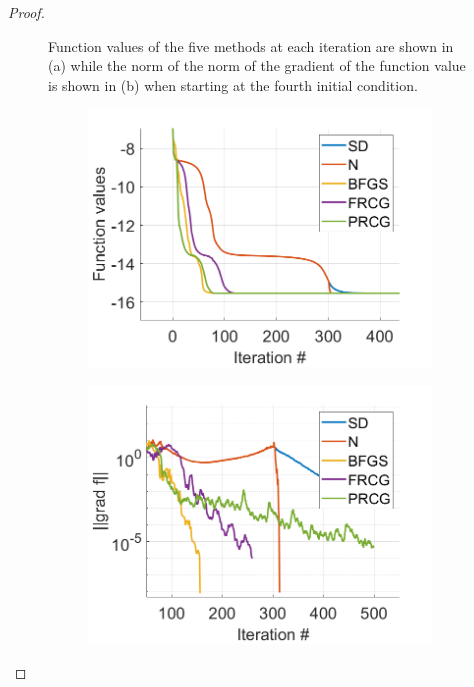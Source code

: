\documentclass[12pt]{report}
\begin{document}
\begin{problem}
\begin{proof}
\begin{figure}[H]
\begin{subfigure}[b]{0.5\linewidth}
                \caption{}
                \label{fig4:b}
                \vspace{4ex}
            \end{subfigure}
            \caption{Function values of the five methods at each iteration are shown in (a) while the norm of the norm of the gradient of the function value is shown in (b) when starting at the fourth initial condition.}
            \label{fig4}
        \end{figure}
        \begin{figure}[H]
            \begin{subfigure}[b]{0.5\linewidth}
                \centering
                \includegraphics[width=\linewidth]{images/random-funcval.png}
                \caption{}
                \label{figRandom:a}
                \vspace{4ex}
            \end{subfigure}%
            \begin{subfigure}[b]{0.5\linewidth}
                \centering
                \includegraphics[width=\linewidth]{images/random-gradf.png}

\end{subfigure}
\end{figure}
\end{proof}
\end{problem}
\end{document}
